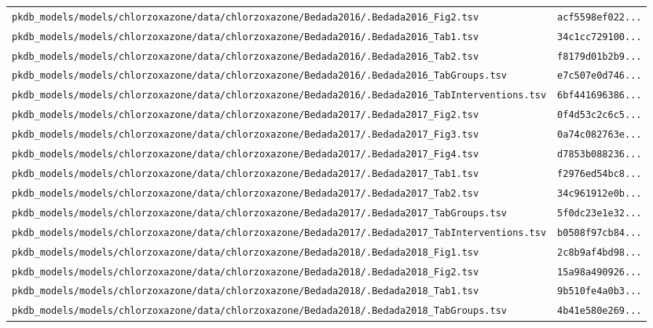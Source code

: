 \documentclass{article}
\begin{document}
\begin{longtable}{ll}
\texttt{pkdb\_models/models/chlorzoxazone/data/chlorzoxazone/Bedada2016/.Bedada2016\_Fig2.tsv} & \texttt{acf5598ef022...} \\
\texttt{pkdb\_models/models/chlorzoxazone/data/chlorzoxazone/Bedada2016/.Bedada2016\_Tab1.tsv} & \texttt{34c1cc729100...} \\
\texttt{pkdb\_models/models/chlorzoxazone/data/chlorzoxazone/Bedada2016/.Bedada2016\_Tab2.tsv} & \texttt{f8179d01b2b9...} \\
\texttt{pkdb\_models/models/chlorzoxazone/data/chlorzoxazone/Bedada2016/.Bedada2016\_TabGroups.tsv} & \texttt{e7c507e0d746...} \\
\texttt{pkdb\_models/models/chlorzoxazone/data/chlorzoxazone/Bedada2016/.Bedada2016\_TabInterventions.tsv} & \texttt{6bf441696386...} \\
\texttt{pkdb\_models/models/chlorzoxazone/data/chlorzoxazone/Bedada2017/.Bedada2017\_Fig2.tsv} & \texttt{0f4d53c2c6c5...} \\
\texttt{pkdb\_models/models/chlorzoxazone/data/chlorzoxazone/Bedada2017/.Bedada2017\_Fig3.tsv} & \texttt{0a74c082763e...} \\
\texttt{pkdb\_models/models/chlorzoxazone/data/chlorzoxazone/Bedada2017/.Bedada2017\_Fig4.tsv} & \texttt{d7853b088236...} \\
\texttt{pkdb\_models/models/chlorzoxazone/data/chlorzoxazone/Bedada2017/.Bedada2017\_Tab1.tsv} & \texttt{f2976ed54bc8...} \\
\texttt{pkdb\_models/models/chlorzoxazone/data/chlorzoxazone/Bedada2017/.Bedada2017\_Tab2.tsv} & \texttt{34c961912e0b...} \\
\texttt{pkdb\_models/models/chlorzoxazone/data/chlorzoxazone/Bedada2017/.Bedada2017\_TabGroups.tsv} & \texttt{5f0dc23e1e32...} \\
\texttt{pkdb\_models/models/chlorzoxazone/data/chlorzoxazone/Bedada2017/.Bedada2017\_TabInterventions.tsv} & \texttt{b0508f97cb84...} \\
\texttt{pkdb\_models/models/chlorzoxazone/data/chlorzoxazone/Bedada2018/.Bedada2018\_Fig1.tsv} & \texttt{2c8b9af4bd98...} \\
\texttt{pkdb\_models/models/chlorzoxazone/data/chlorzoxazone/Bedada2018/.Bedada2018\_Fig2.tsv} & \texttt{15a98a490926...} \\
\texttt{pkdb\_models/models/chlorzoxazone/data/chlorzoxazone/Bedada2018/.Bedada2018\_Tab1.tsv} & \texttt{9b510fe4a0b3...} \\
\texttt{pkdb\_models/models/chlorzoxazone/data/chlorzoxazone/Bedada2018/.Bedada2018\_TabGroups.tsv} & \texttt{4b41e580e269...} \\

\end{longtable}
\end{document}
